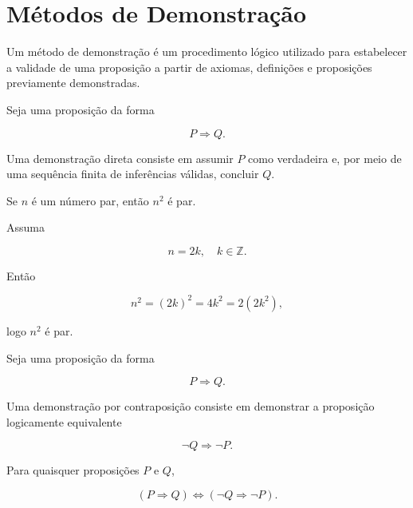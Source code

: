 \documentclass[../../main]{subfiles}
\begin{document}
\section{Métodos de Demonstração}
\label{sec:matematica:logica-matematica:metodos-de-demonstracao}

\begin{defn}
	\label{def:matematica:logica-matematica:metodos-de-demonstracao:metodo-de-demonstracao}

	Um método de demonstração é um procedimento lógico utilizado para
	estabelecer a validade de uma proposição a partir de axiomas,
	definições e proposições previamente demonstradas.
\end{defn}

\begin{defn}
	\label{def:matematica:logica-matematica:metodos-de-demonstracao:demonstracao-direta}

	Seja uma proposição da forma

	\[
		P \Rightarrow Q.
	\]

	Uma demonstração direta consiste em assumir \(P\) como verdadeira e,
	por meio de uma sequência finita de inferências válidas, concluir \(Q\).
\end{defn}

\begin{ex}
	Se \(n\) é um número par, então \(n^2\) é par.

	Assuma

	\[
		n = 2k,
		\quad
		k \in \mathbb{Z}.
	\]

	Então

	\[
		n^2 = (2k)^2 = 4k^2 = 2(2k^2),
	\]

	logo \(n^2\) é par.
\end{ex}

\begin{defn}
	\label{def:matematica:logica-matematica:metodos-de-demonstracao:contraposicao}

	Seja uma proposição da forma

	\[
		P \Rightarrow Q.
	\]

	Uma demonstração por contraposição consiste em demonstrar a
	proposição logicamente equivalente

	\[
		\neg Q \Rightarrow \neg P.
	\]
\end{defn}

\begin{prop}
	\label{prop:matematica:logica-matematica:metodos-de-demonstracao:equivalencia-contraposicao}

	Para quaisquer proposições \(P\) e \(Q\),

	\[
		(P \Rightarrow Q)
		\Leftrightarrow
		(\neg Q \Rightarrow \neg P).
	\]
\end{prop}
\end{document}
